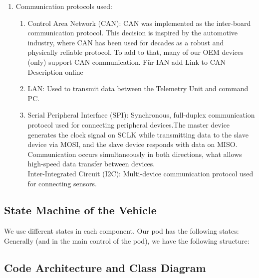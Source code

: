 \begin{enumerate}
    \item Communication protocols used: 
\begin{enumerate}
    \item Control Area Network (CAN): CAN was implemented as the inter-board communication protocol. This decision is inspired by the automotive industry, where CAN has been used for decades as a robust and physically reliable protocol.
    To add to that, many of our OEM devices (only) support CAN communication. Für IAN add Link to CAN Description online
    \item LAN: Used to transmit data between the Telemetry Unit and command PC.

    \item Serial Peripheral Interface (SPI): Synchronous, full-duplex communication protocol used for connecting peripheral devices.The master device generates the clock signal on SCLK while transmitting data to the slave device via MOSI, and the slave device responds with data on MISO. Communication occurs simultaneously in both directions, what allows high-speed data transfer between devices. \\
    Inter-Integrated Circuit (I2C): Multi-device communication protocol used for connecting sensors.
\end{enumerate}

\end{enumerate}


\subsection{State Machine of the Vehicle}

We use different states in each component. Our pod has the following states:
Generally (and in the main control of the pod), we have the following structure:

\subsection{Code Architecture and Class Diagram}

